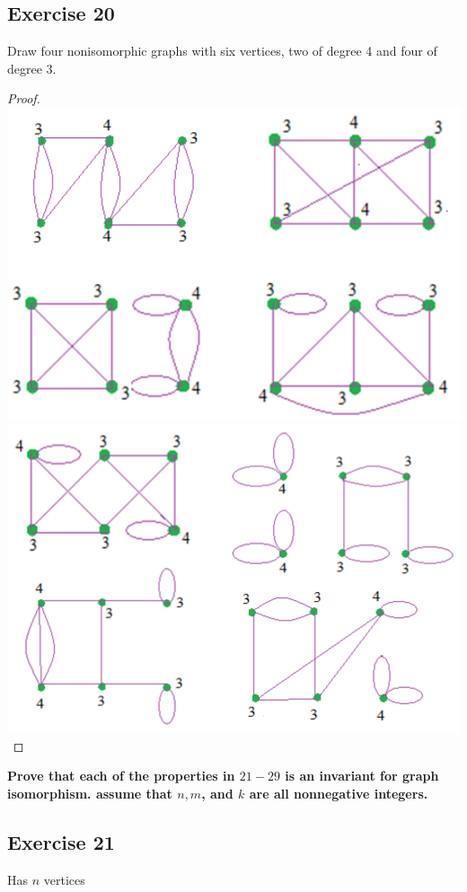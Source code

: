 \documentclass[14pt]{extarticle}
\newcommand{\cy}{\color{cyan}}
\begin{document}
\subsection{Exercise 20}
Draw four nonisomorphic graphs with six vertices, two of degree 4 and four of degree 3.

\begin{proof}
\includegraphics[scale=0.25]{../images/10.3.20.a.png}
\includegraphics[scale=0.25]{../images/10.3.20.b.png}
\end{proof}

{\bf \cy Prove that each of the properties in \(21-29\) is an invariant for graph isomorphism. assume that \(n, m\), and 
\(k\) are all nonnegative integers.}

\subsection{Exercise 21}
Has \(n\) vertices
\end{document}

